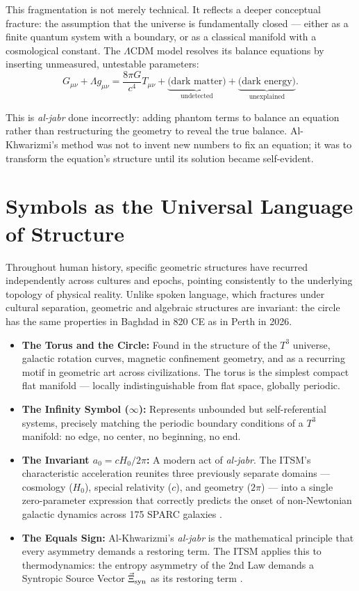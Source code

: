 \documentclass[aps,prd,11pt,onecolumn,superscriptaddress,nofootinbib,floatfix]{revtex4-2}
\begin{document}
This fragmentation is not merely technical. It reflects a deeper conceptual fracture: the assumption that the universe is fundamentally closed --- either as a finite quantum system with a boundary, or as a classical manifold with a cosmological constant. The $\Lambda$CDM model resolves its balance equations by inserting unmeasured, untestable parameters:
\begin{equation}
    G_{\mu\nu} + \Lambda g_{\mu\nu} = \frac{8\pi G}{c^4} T_{\mu\nu} + \underbrace{\text{(dark matter)}}_{\text{undetected}} + \underbrace{\text{(dark energy)}}_{\text{unexplained}}.
\end{equation}

This is \textit{al-jabr} done incorrectly: adding phantom terms to balance an equation rather than restructuring the geometry to reveal the true balance. Al-Khwarizmi's method was not to invent new numbers to fix an equation; it was to transform the equation's structure until its solution became self-evident.

\section{Symbols as the Universal Language of Structure}
\label{sec:symbols}

Throughout human history, specific geometric structures have recurred independently across cultures and epochs, pointing consistently to the underlying topology of physical reality. Unlike spoken language, which fractures under cultural separation, geometric and algebraic structures are invariant: the circle has the same properties in Baghdad in 820 CE as in Perth in 2026.

\begin{itemize}
    \item \textbf{The Torus and the Circle:} Found in the structure of the $T^3$ universe, galactic rotation curves, magnetic confinement geometry, and as a recurring motif in geometric art across civilizations. The torus is the simplest compact flat manifold --- locally indistinguishable from flat space, globally periodic.
    \item \textbf{The Infinity Symbol ($\infty$):} Represents unbounded but self-referential systems, precisely matching the periodic boundary conditions of a $T^3$ manifold: no edge, no center, no beginning, no end.
    \item \textbf{The Invariant $a_0 = cH_0/2\pi$:} A modern act of \textit{al-jabr}. The ITSM's characteristic acceleration reunites three previously separate domains --- cosmology ($H_0$), special relativity ($c$), and geometry ($2\pi$) --- into a single zero-parameter expression that correctly predicts the onset of non-Newtonian galactic dynamics across 175 SPARC galaxies \cite{itsm_main}.
    \item \textbf{The Equals Sign:} Al-Khwarizmi's \textit{al-jabr} is the mathematical principle that every asymmetry demands a restoring term. The ITSM applies this to thermodynamics: the entropy asymmetry of the 2nd Law demands a Syntropic Source Vector $\vec{\Xi}_{\rm syn}$ as its restoring term \cite{itsm_thermo}.
\end{itemize}
\end{document}
